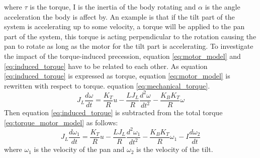 where $\tau$ is the torque, I is the inertia of the body rotating and $\alpha$ is the angle acceleration the body is affect by. An example is that if the tilt part of the system is accelerating up to some velocity, a torque will be applied to the pan part of the system, this torque is acting perpendicular to the rotation causing the pan to rotate as long as the motor for the tilt part is accelerating. To investigate the impact of the torque-induced precession, equation \ref{eq:motor_model} and \ref{eq:induced_torque} have to be related to each other. As equation \ref{eq:induced_torque} is expressed as torque, equation \ref{eq:motor_model} is rewritten with respect to torque. equation \ref{eq:mechanical_torque}.
\begin{equation}
	J_L \frac{d\omega}{dt} = \frac{K_T}{R} u - \frac{L J_L}{R} \frac{d^{2}\omega}{dt^{2}} - \frac{K_B K_T}{R} \omega\label{eq:torque_motor_model}
\end{equation}
Then equation \ref{eq:induced_torque} is subtracted from the total torque \ref{eq:torque_motor_model} as follows:
\begin{equation}
	J_L \frac{d\omega_{1}}{dt} = \frac{K_T}{R} u - \frac{L J_L}{R} \frac{d^{2}\omega_{1}}{dt^{2}} - \frac{K_B K_T}{R} \omega_{1} - I \frac{d\omega_{2}}{dt}\label{eq:coupled_torque_motor_model}
\end{equation}
where $\omega_1$ is the velocity of the pan and $\omega_2$ is the velocity of the tilt. 

